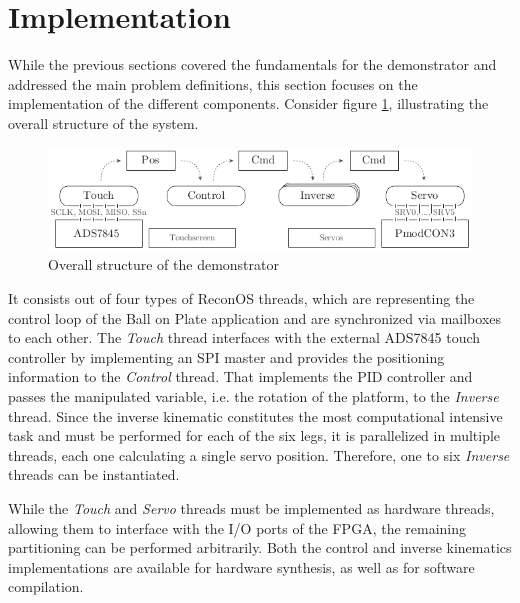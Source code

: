 \section{Implementation}
While the previous sections covered the fundamentals for the demonstrator and
addressed the main problem definitions, this section focuses on the
implementation of the different components. Consider figure
\ref{fig:demo_structure}, illustrating the overall structure of the system.
\begin{figure}
	\centering
	\includegraphics{../figures/demo_structure}
	\caption{Overall structure of the demonstrator}
	\label{fig:demo_structure}
\end{figure}
It consists out of four types of ReconOS threads, which are representing the
control loop of the Ball on Plate application and are synchronized via
mailboxes to each other. The \emph{Touch} thread interfaces with the external
ADS7845 touch controller by implementing an \ac{SPI} master and provides the
positioning information to the \emph{Control} thread. That implements the
\ac{PID} controller and passes the manipulated variable, i.e. the rotation of
the platform, to the \emph{Inverse} thread. Since the inverse kinematic
constitutes the most computational intensive task and must be performed for
each of the six legs, it is parallelized in multiple threads, each one
calculating a single servo position. Therefore, one to six \emph{Inverse}
threads can be instantiated.

While the \emph{Touch} and \emph{Servo} threads must be implemented as
hardware threads, allowing them to interface with the I/O ports of the FPGA,
the remaining partitioning can be performed arbitrarily. Both the control and
inverse kinematics implementations are available for hardware synthesis, as
well as for software compilation.

